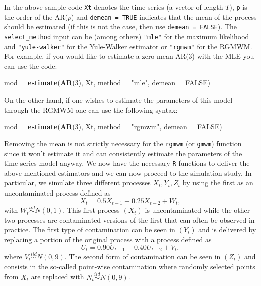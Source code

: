 \documentclass[]{book}
\newenvironment{Shaded}{\begin{snugshade}}{\end{snugshade}}
\newcommand{\KeywordTok}[1]{\textcolor[rgb]{0.13,0.29,0.53}{\textbf{#1}}}
\newcommand{\DataTypeTok}[1]{\textcolor[rgb]{0.13,0.29,0.53}{#1}}
\newcommand{\DecValTok}[1]{\textcolor[rgb]{0.00,0.00,0.81}{#1}}
\newcommand{\StringTok}[1]{\textcolor[rgb]{0.31,0.60,0.02}{#1}}
\newcommand{\OtherTok}[1]{\textcolor[rgb]{0.56,0.35,0.01}{#1}}
\newcommand{\NormalTok}[1]{#1}
\theoremstyle{definition}
\theoremstyle{definition}
\theoremstyle{definition}
\theoremstyle{remark}
\begin{document}
In the above sample code \texttt{Xt} denotes the time series (a vector
of length \(T\)), \texttt{p} is the order of the AR(\(p\)) and
\texttt{demean\ =\ TRUE} indicates that the mean of the process should
be estimated (if this is not the case, then use
\texttt{demean\ =\ FALSE}). The \texttt{select\_method} input can be
(among others) \texttt{"mle"} for the maximum likelihood and
\texttt{"yule-walker"} for the Yule-Walker estimator or \texttt{"rgmwm"}
for the RGMWM. For example, if you would like to estimate a zero mean
AR(3) with the MLE you can use the code:

\begin{Shaded}
\begin{Highlighting}[]
\NormalTok{mod =}\StringTok{ }\KeywordTok{estimate}\NormalTok{(}\KeywordTok{AR}\NormalTok{(}\DecValTok{3}\NormalTok{), Xt, }\DataTypeTok{method =} \StringTok{"mle"}\NormalTok{, }\DataTypeTok{demean =} \OtherTok{FALSE}\NormalTok{)}
\end{Highlighting}
\end{Shaded}

On the other hand, if one wishes to estimate the parameters of this
model through the RGMWM one can use the following syntax:

\begin{Shaded}
\begin{Highlighting}[]
\NormalTok{mod =}\StringTok{ }\KeywordTok{estimate}\NormalTok{(}\KeywordTok{AR}\NormalTok{(}\DecValTok{3}\NormalTok{), Xt, }\DataTypeTok{method =} \StringTok{"rgmwm"}\NormalTok{, }\DataTypeTok{demean =} \OtherTok{FALSE}\NormalTok{)}
\end{Highlighting}
\end{Shaded}

Removing the mean is not strictly necessary for the \texttt{rgmwm} (or
\texttt{gmwm}) function since it won't estimate it and can consistently
estimate the parameters of the time series model anyway. We now have the
necessary \texttt{R} functions to deliver the above mentioned estimators
and we can now proceed to the simulation study. In particular, we
simulate three different processes \(X_t, Y_t, Z_t\) by using the first
as an uncontaminated process defined as
\[X_t = 0.5 X_{t-1} - 0.25 X_{t-2} + W_t,\] with
\(W_t \overset{iid}{\sim} N(0, 1)\). This first process \((X_t)\) is
uncontaminated while the other two processes are contaminated versions
of the first that can often be observed in practice. The first type of
contamination can be seen in \((Y_t)\) and is delivered by replacing a
portion of the original process with a process defined as
\[U_t = 0.90 U_{t-1} - 0.40 U_{t-2} + V_t,\] where
\(V_t \overset{iid}{\sim} N(0, 9)\). The second form of contamination
can be seen in \((Z_t)\) and consists in the so-called point-wise
contamination where randomly selected points from \(X_t\) are replaced
with \(N_t \overset{iid}{\sim} N(0, 9)\).
\end{document}

